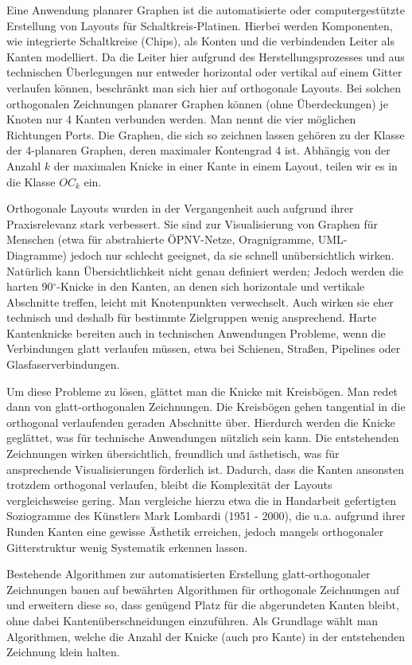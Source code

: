 \documentclass[a4paper]{scrreprt}
\theoremstyle{definition}
\newcommand{\degree}{\ensuremath{^\circ}}
\begin{document}
Eine Anwendung planarer Graphen ist die automatisierte oder computergestützte Erstellung von Layouts für Schaltkreis-Platinen. Hierbei werden Komponenten, wie integrierte Schaltkreise (Chips), als Konten und die verbindenden Leiter als Kanten modelliert. Da die Leiter hier aufgrund des Herstellungsprozesses und aus technischen Überlegungen nur entweder horizontal oder vertikal auf einem Gitter verlaufen können, beschränkt man sich hier auf orthogonale Layouts. Bei solchen orthogonalen Zeichnungen planarer Graphen können (ohne Überdeckungen) je Knoten nur 4 Kanten verbunden werden. Man nennt die vier möglichen Richtungen Ports. Die Graphen, die sich so zeichnen lassen gehören zu der Klasse der 4-planaren Graphen, deren maximaler Kontengrad 4 ist. Abhängig von der Anzahl $k$ der maximalen Knicke in einer Kante in einem Layout, teilen wir es in die Klasse $OC_k$ ein. 

Orthogonale Layouts wurden in der Vergangenheit auch aufgrund ihrer Praxisrelevanz stark verbessert. Sie sind zur Visualisierung von Graphen für Menschen (etwa für abstrahierte ÖPNV-Netze, Oragnigramme, UML-Diagramme) jedoch nur schlecht geeignet, da sie schnell unübersichtlich wirken. Natürlich kann Übersichtlichkeit nicht genau definiert werden; Jedoch werden die harten 90\degree-Knicke in den Kanten, an denen sich horizontale und vertikale Abschnitte treffen, leicht mit Knotenpunkten verwechselt. Auch wirken sie eher technisch und deshalb für bestimmte Zielgruppen wenig ansprechend. Harte Kantenknicke bereiten auch in technischen Anwendungen Probleme, wenn die Verbindungen glatt verlaufen müssen, etwa bei Schienen, Straßen, Pipelines oder Glasfaserverbindungen. 

Um diese Probleme zu lösen, glättet man die Knicke mit Kreisbögen. Man redet dann von glatt-orthogonalen Zeichnungen. Die Kreisbögen gehen tangential in die orthogonal verlaufenden geraden Abschnitte über. Hierdurch werden die Knicke geglättet, was für technische Anwendungen nützlich sein kann. Die entstehenden Zeichnungen wirken übersichtlich, freundlich und ästhetisch, was für ansprechende Visualisierungen förderlich ist. Dadurch, dass die Kanten ansonsten trotzdem orthogonal verlaufen, bleibt die Komplexität der Layouts vergleichsweise gering. Man vergleiche hierzu etwa die in Handarbeit gefertigten Soziogramme des Künstlers Mark Lombardi (1951 - 2000), die u.a. aufgrund ihrer Runden Kanten eine gewisse Ästhetik erreichen, jedoch mangels orthogonaler Gitterstruktur wenig Systematik erkennen lassen. 

Bestehende Algorithmen zur automatisierten Erstellung glatt-orthogonaler Zeichnungen bauen auf bewährten Algorithmen für orthogonale Zeichnungen auf und erweitern diese so, dass genügend Platz für die abgerundeten Kanten bleibt, ohne dabei Kantenüberschneidungen einzuführen. Als Grundlage wählt man Algorithmen, welche die Anzahl der Knicke (auch pro Kante) in der entstehenden Zeichnung klein halten. 
\end{document}
